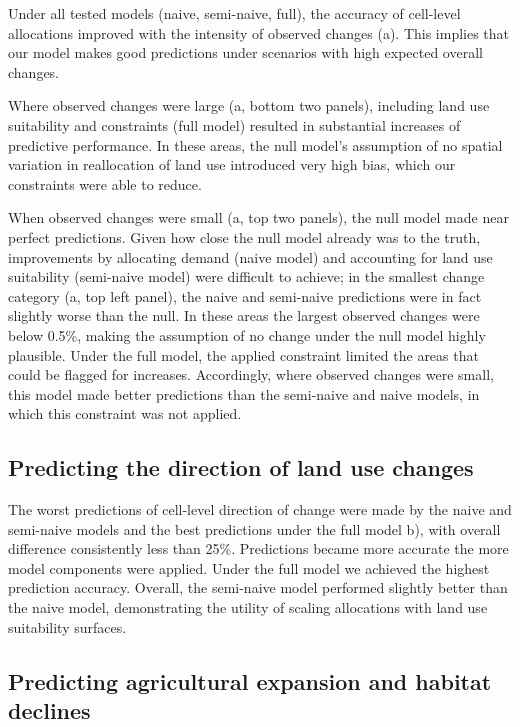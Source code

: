 \documentclass[titlesmallcaps,copyrightpage]{uomthesis}\usepackage[]{graphicx}\usepackage[]{color}
\begin{document}
Under all tested models (naive, semi-naive, full), the accuracy of
cell-level allocations improved with the intensity of observed changes
(a). This implies that our model makes good
predictions under scenarios with high expected overall changes.

Where observed changes were large (a, bottom
two panels), including land use suitability and constraints (full model)
resulted in substantial increases of predictive performance. In these
areas, the null model's assumption of no spatial variation in
reallocation of land use introduced very high bias, which our
constraints were able to reduce.

When observed changes were small (a, top two
panels), the null model made near perfect predictions. Given how close
the null model already was to the truth, improvements by allocating
demand (naive model) and accounting for land use suitability (semi-naive
model) were difficult to achieve; in the smallest change category (a, top left panel), the naive and semi-naive
predictions were in fact slightly worse than the null. In these areas
the largest observed changes were below 0.5\%, making the assumption of
no change under the null model highly plausible. Under the full model,
the applied constraint limited the areas that could be flagged for
increases. Accordingly, where observed changes were small, this model
made better predictions than the semi-naive and naive models, in which
this constraint was not applied.

\subsection{Predicting the direction of land use
changes}

The worst predictions of cell-level direction of change were made by the
naive and semi-naive models and the best predictions under the full
model b), with overall difference consistently
less than 25\%. Predictions became more accurate the more model
components were applied. Under the full model we achieved the highest
prediction accuracy. Overall, the semi-naive model performed slightly
better than the naive model, demonstrating the utility of scaling
allocations with land use suitability surfaces.

\subsection{Predicting agricultural expansion and habitat
declines}
\end{document}
